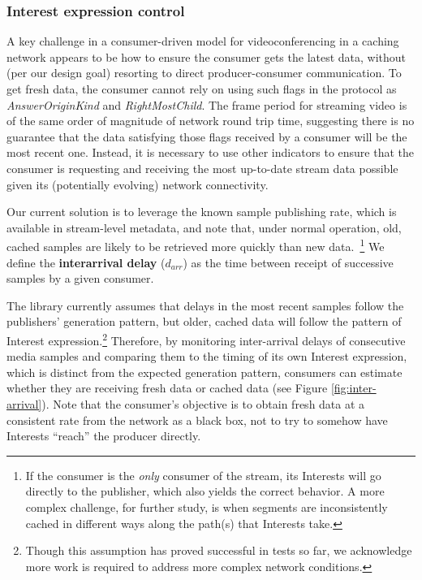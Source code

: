 \documentclass{icn/sig-alternate-2013} %
\begin{document}
\subsubsection{Interest expression control}


A key challenge in a consumer-driven model for videoconferencing in a caching network appears to be how to ensure the consumer gets the latest data, without (per our design goal) resorting to direct producer-consumer communication.
To get fresh data, the consumer cannot rely on using such flags in the protocol as \textit{AnswerOriginKind} and \textit{RightMostChild}. The frame period for  streaming video is of the same order of magnitude of network round trip time, suggesting there is no guarantee that the data satisfying those flags received by a consumer will be the most recent one. Instead, it is necessary to use other indicators to ensure that the consumer is requesting and receiving the most up-to-date stream data possible given its (potentially evolving) network connectivity. 

Our current solution is to leverage the known sample publishing rate, which is available in stream-level metadata, and note that, under normal operation, old, cached samples are likely to be retrieved more quickly than new data.~\footnote{If the consumer is the \emph{only} consumer of the stream, its Interests will go directly to the publisher, which also yields the correct behavior. A more complex challenge, for further study, is when segments are inconsistently cached in different ways along the path(s) that Interests take.} We define the \textbf{interarrival delay} ($d_{arr}$) as the time between receipt of successive samples by a given consumer. 

The library currently assumes that delays in the most recent samples follow the publishers' generation pattern, but older, cached data will follow the pattern of Interest expression.\footnote{Though this assumption has proved successful in tests so far, we acknowledge more work is required to address more complex network conditions.} Therefore, by monitoring inter-arrival delays of consecutive media samples and comparing them to the timing of its own Interest expression, which is distinct from the expected generation pattern, consumers can estimate whether they are receiving fresh data or cached data (see Figure \ref{fig:inter-arrival}). Note that the consumer's objective is to obtain fresh data at a consistent rate from the network as a black box, not to try to somehow have Interests ``reach'' the producer directly.  
\end{document}
